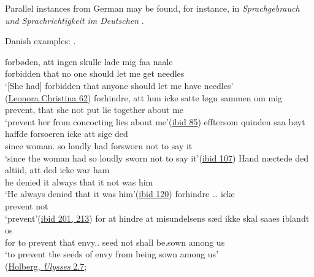 Parallel instances from German may be found, for instance, in \textit{Sprachgebrauch und Sprachrichtigkeit im Deutschen} \citep[\href{https://archive.org/details/sprachgebrauchu00andrgoog/page/n223/mode/2up?view=theater}{209ff}]{andresen1892sprachgebrauch}. %

Danish examples: .

\ea \label{ex:07-71}
\ea
\gll forbøden, att ingen skulle lade mig faa naale\\
 {forbidden} that {no one} should let me get needles\\
\glt `[She had] forbidden that anyone should let me have needles'\\\hfill(\href{https://www.gutenberg.org/cache/epub/41072/pg41072-images.html#Side_70}{Leonora Christina 62}) %
\ex 
\gll forhindre, att hun icke satte løgn sammen om mig\\
 prevent, that she not put lie together about me\\
\glt `prevent her from concocting lies about me'\hfill(\href{https://www.gutenberg.org/cache/epub/41072/pg41072-images.html#Side_97}{ibid 85})
\ex 
\gll efftersom quinden saa høyt haffde forsoeren icke att sige ded\\
 since woman.\DEF{} so loudly had forsworn not to say it\\
\glt `since the woman had so loudly sworn not to say it'\hfill(\href{https://www.gutenberg.org/cache/epub/41072/pg41072-images.html#Side_122}{ibid 107})
\ex 
\gll Hand næctede ded altiid, att ded icke war ham\\
 he denied it always that it not was him\\
\glt `He always denied that it was him'\hfill(\href{https://www.gutenberg.org/cache/epub/41072/pg41072-images.html#Side_137}{ibid 120})
\ex 
\gll forhindre {\dots} icke\\
 prevent {} not\\
\glt `prevent'\hfill(\href{https://www.gutenberg.org/cache/epub/41072/pg41072-images.html}{ibid 201, 213})
\ex{}
\gll for at hindre at misundelsens sæd ikke skal saaes iblandt os\\
 for to prevent that envy.\DEF.\POSS{} seed not shall be.sown among us\\
\glt `to prevent the seeds of envy from being sown among us'\\\hfill(\href{http://holbergsskrifter.dk/holberg-public/view?docId=skuespill%2FUlysses%2FUlysses.page&brand=&chunk.id=act2sc7&toc.id=act2&toc.depth=1}{Holberg, \textit{Ulysses} 2.7}; %
